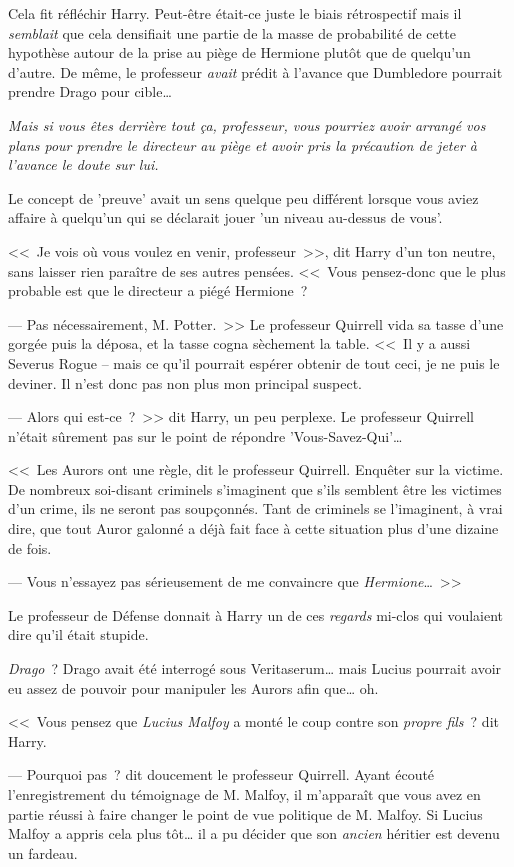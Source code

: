 Cela fit réfléchir Harry. Peut-être était-ce juste le biais rétrospectif mais il \emph{semblait} que cela densifiait une partie de la masse de probabilité de cette hypothèse autour de la prise au piège de Hermione plutôt que de quelqu'un d'autre. De même, le professeur \emph{avait} prédit à l'avance que Dumbledore pourrait prendre Drago pour cible…

\emph{Mais si vous êtes derrière tout ça, professeur, vous pourriez avoir arrangé vos plans pour prendre le directeur au piège et avoir pris la précaution de jeter à l'avance le doute sur lui.}

Le concept de 'preuve' avait un sens quelque peu différent lorsque vous aviez affaire à quelqu'un qui se déclarait jouer 'un niveau au-dessus de vous'.

<<~Je vois où vous voulez en venir, professeur~>>, dit Harry d'un ton neutre, sans laisser rien paraître de ses autres pensées. <<~Vous pensez-donc que le plus probable est que le directeur a piégé Hermione~?

--- Pas nécessairement, M. Potter.~>> Le professeur Quirrell vida sa tasse d'une gorgée puis la déposa, et la tasse cogna sèchement la table. <<~Il y a aussi Severus Rogue -- mais ce qu'il pourrait espérer obtenir de tout ceci, je ne puis le deviner. Il n'est donc pas non plus mon principal suspect.

--- Alors qui est-ce~?~>> dit Harry, un peu perplexe. Le professeur Quirrell n'était sûrement pas sur le point de répondre 'Vous-Savez-Qui'…

<<~Les Aurors ont une règle, dit le professeur Quirrell. Enquêter sur la victime. De nombreux soi-disant criminels s'imaginent que s'ils semblent être les victimes d'un crime, ils ne seront pas soupçonnés. Tant de criminels se l'imaginent, à vrai dire, que tout Auror galonné a déjà fait face à cette situation plus d'une dizaine de fois.

--- Vous n'essayez pas sérieusement de me convaincre que \emph{Hermione}…~>>

Le professeur de Défense donnait à Harry un de ces \emph{regards} mi-clos qui voulaient dire qu'il était stupide.

\emph{Drago}~? Drago avait été interrogé sous Veritaserum… mais Lucius pourrait avoir eu assez de pouvoir pour manipuler les Aurors afin que… oh.

<<~Vous pensez que \emph{Lucius Malfoy} a monté le coup contre son \emph{propre fils}~? dit Harry.

--- Pourquoi pas~? dit doucement le professeur Quirrell. Ayant écouté l'enregistrement du témoignage de M. Malfoy, il m'apparaît que vous avez en partie réussi à faire changer le point de vue politique de M. Malfoy. Si Lucius Malfoy a appris cela plus tôt… il a pu décider que son \emph{ancien} héritier est devenu un fardeau.

